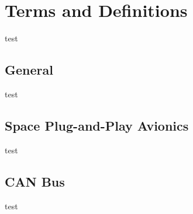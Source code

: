 \section{Terms and Definitions}
test
\subsection{General}
test
\subsection{Space Plug-and-Play Avionics}
test
\subsection{CAN Bus}
test
